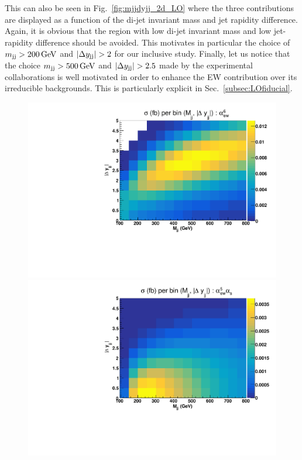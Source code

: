 This can also be seen in Fig.~\ref{fig:mjjdyjj_2d_LO} where the three contributions are displayed as a function of the di-jet invariant mass and jet rapidity difference.
Again, it is obvious that the region with low di-jet invariant mass and low jet-rapidity difference should be avoided.
This motivates in particular the choice of $m_{\text{j}\text{j}} > 200\,\text{GeV}$ and $|\Delta y_{\text{j}\text{j}}| > 2$ for our inclusive study.
Finally, let us notice that the choice $m_{\text{j}\text{j}} > 500\,\text{GeV}$ and $|\Delta y_{\text{j}\text{j}}| > 2.5$ made by the experimental collaborations is well motivated in order to enhance the EW contribution over its irreducible backgrounds.
This is particularly explicit in Sec.~\ref{subsec:LOfiducial}.

\begin{figure}[ht]
\centering
\includegraphics[scale=0.395]{figures/scanfigures/scan_ew6.pdf}
\includegraphics[scale=0.395]{figures/scanfigures/scan_ew5qcd1.pdf}

\end{figure}

